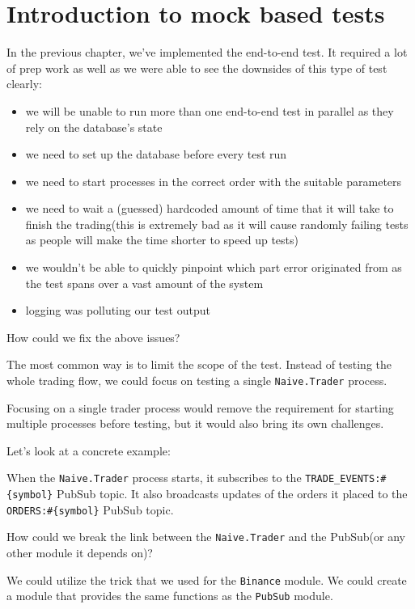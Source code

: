 \documentclass[
  oneside]{book}
\providecommand{\tightlist}{%
  \setlength{\itemsep}{0pt}\setlength{\parskip}{0pt}}
\begin{document}
\section{Introduction to mock based tests}\label{introduction-to-mock-based-tests}

In the previous chapter, we've implemented the end-to-end test. It required a lot of prep work as well as we were able to see the downsides of this type of test clearly:

\begin{itemize}
\tightlist
\item
  we will be unable to run more than one end-to-end test in parallel as they rely on the database's state
\item
  we need to set up the database before every test run
\item
  we need to start processes in the correct order with the suitable parameters
\item
  we need to wait a (guessed) hardcoded amount of time that it will take to finish the trading(this is extremely bad as it will cause randomly failing tests as people will make the time shorter to speed up tests)
\item
  we wouldn't be able to quickly pinpoint which part error originated from as the test spans over a vast amount of the system
\item
  logging was polluting our test output
\end{itemize}

\newpage

How could we fix the above issues?

The most common way is to limit the scope of the test. Instead of testing the whole trading flow, we could focus on testing a single \texttt{Naive.Trader} process.

Focusing on a single trader process would remove the requirement for starting multiple processes before testing, but it would also bring its own challenges.

Let's look at a concrete example:

When the \texttt{Naive.Trader} process starts, it subscribes to the \texttt{TRADE\_EVENTS:\#\{symbol\}} PubSub topic. It also broadcasts updates of the orders it placed to the \texttt{ORDERS:\#\{symbol\}} PubSub topic.

How could we break the link between the \texttt{Naive.Trader} and the PubSub(or any other module it depends on)?

We could utilize the trick that we used for the \texttt{Binance} module. We could create a module that provides the same functions as the \texttt{PubSub} module.
\end{document}
